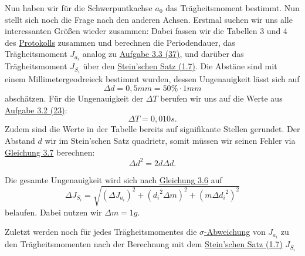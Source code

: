 Nun haben wir für die Schwerpuntkachse $a_0$ das Trägheitsmoment bestimmt. Nun stellt sich noch die Frage nach den anderen Achsen. Erstmal suchen wir uns alle interessanten Größen wieder zusammen:
Dabei fassen wir die Tabellen 3 und 4 des \hyperref[Protokoll]{Protokolls} zusammen und berechnen die Periodendauer, das Trägheitsmoment $J_{a_i}$ analog zu \hyperref[aufgabe_3-3]{Aufgabe 3.3 (37)}, und darüber das Trägheitsmoment $J_{S_i}$ über den \hyperref[eq:steinsatz]{Stein'schen Satz (1.7)}.
Die Abstäne sind mit einem Millimetergeodreieck bestimmt wurden, dessen Ungenauigkeit lässt sich auf 
\begin{equation}
    \Delta d = 0,5mm = 50\% \cdot 1mm
\end{equation}
abschätzen. Für die Ungenauigkeit der $\Delta T$ berufen wir uns auf die Werte aus \hyperref[eq:t_reak]{Aufgabe 3.2 (23)}:
\begin{equation}
    \Delta T = 0,010 s.
\end{equation}
Zudem sind die Werte in der Tabelle bereits auf signifikante Stellen gerundet. 
Der Abstand $d$ wir im Stein'schen Satz quadrietr, somit müssen wir seinen Fehler via \hyperref[eq:gauss_fehlfortpflanzung]{Gleichung 3.7} berechnen:
\begin{equation}
    \Delta d^2 = 2d \Delta d.
\end{equation}

Die gesamte Ungenauigkeit wird sich nach \hyperref[eq:fehler_summe]{Gleichung 3.6} auf
\begin{equation}
    \Delta J_{S_i} = \sqrt{(\Delta J_{a_i})^2 + ({d_i}^2 \Delta m)^2 + (m \Delta {d_i}^2)^2}
\end{equation}
belaufen. Dabei nutzen wir $\Delta m = 1g$.

Zuletzt werden noch für jedes Trägheitsmomentes die \hyperref[eq:signifikante_abweichung]{$\sigma$-Abweichung} von $J_{a_i}$ zu den Trägheitsmomenten nach der Berechnung mit dem \hyperref[eq:steinsatz]{Stein'schen Satz (1.7)} $J_{S_i}$

